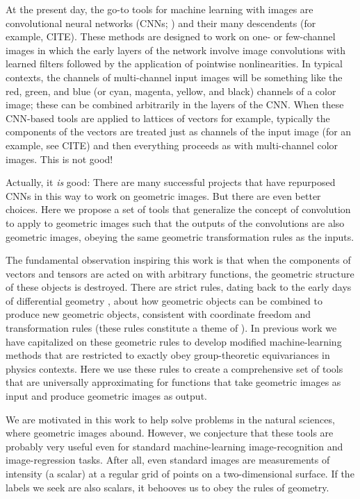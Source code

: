 \documentclass{article}
\theoremstyle{definition}
\begin{document}
At the present day, the go-to tools for machine learning with images are convolutional neural networks (CNNs; \cite{lecun1989backpropagation}) and their many descendents (for example, CITE).
These methods are designed to work on one- or few-channel images in which the early layers of the network involve image convolutions with learned filters followed by the application of pointwise nonlinearities.
In typical contexts, the channels of multi-channel input images will be something like the red, green, and blue (or cyan, magenta, yellow, and black) channels of a color image; these can be combined arbitrarily in the layers of the CNN.
When these CNN-based tools are applied to lattices of vectors for example, typically the components of the vectors are treated just as channels of the input image (for an example, see CITE) and then everything proceeds as with multi-channel color images.
This is not good! %

Actually, it \emph{is} good: There are many successful projects that have repurposed CNNs in this way to work on geometric images.
But there are even better choices.
Here we propose a set of tools that generalize the concept of convolution to apply to geometric images such that the outputs of the convolutions are also geometric images, obeying the same geometric transformation rules as the inputs.

The fundamental observation inspiring this work is that when the components of vectors and tensors are acted on with arbitrary functions, the geometric structure of these objects is destroyed.
There are strict rules, dating back to the early days of differential geometry \cite{ricci}, about how geometric objects can be combined to produce new geometric objects, consistent with coordinate freedom and transformation rules (these rules constitute a theme of \cite{mcp}).
In previous work \cite{villar2021scalars, villar2022dimensionless, yao2021simple} we have capitalized on these geometric rules to develop modified machine-learning methods that are restricted to exactly obey group-theoretic equivariances in physics contexts.
Here we use these rules to create a comprehensive set of tools that are universally approximating for functions that take geometric images as input and produce geometric images as output.

We are motivated in this work to help solve problems in the natural sciences, where geometric images abound.
However, we conjecture that these tools are probably very useful even for standard machine-learning image-recognition and image-regression tasks.
After all, even standard images are measurements of intensity (a scalar) at a regular grid of points on a two-dimensional surface.
If the labels we seek are also scalars, it behooves us to obey the rules of geometry.
\end{document}
